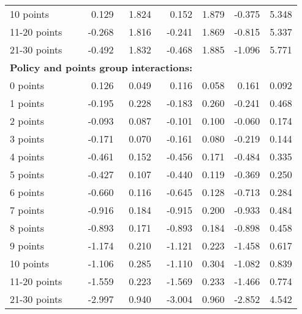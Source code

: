 \begin{table}
\begin{tabular}{l r r r r r r}
10 points  &  0.129  &  1.824  &  0.152  &  1.879  & -0.375  &  5.348   \\ 
 
11-20 points  & -0.268  &  1.816  & -0.241  &  1.869  & -0.815  &  5.337   \\ 
 
21-30 points  & -0.492  &  1.832  & -0.468  &  1.885  & -1.096  &  5.771   \\ 
 

\hline 
 
\multicolumn{4}{l}{\textbf{Policy and points group interactions:}}  \\ 
 
0 points  &  0.126  &  0.049  &  0.116  &  0.058  &  0.161  &  0.092   \\ 
 
1 points  & -0.195  &  0.228  & -0.183  &  0.260  & -0.241  &  0.468   \\ 
 
2 points  & -0.093  &  0.087  & -0.101  &  0.100  & -0.060  &  0.174   \\ 
 
3 points  & -0.171  &  0.070  & -0.161  &  0.080  & -0.219  &  0.144   \\ 
 
4 points  & -0.461  &  0.152  & -0.456  &  0.171  & -0.484  &  0.335   \\ 
 
5 points  & -0.427  &  0.107  & -0.440  &  0.119  & -0.369  &  0.250   \\ 
 
6 points  & -0.660  &  0.116  & -0.645  &  0.128  & -0.713  &  0.284   \\ 
 
7 points  & -0.916  &  0.184  & -0.915  &  0.200  & -0.933  &  0.484   \\ 
 
8 points  & -0.893  &  0.171  & -0.893  &  0.184  & -0.898  &  0.458   \\ 
 
9 points  & -1.174  &  0.210  & -1.121  &  0.223  & -1.458  &  0.617   \\ 
 
10 points  & -1.106  &  0.285  & -1.110  &  0.304  & -1.082  &  0.839   \\ 
 
11-20 points  & -1.559  &  0.223  & -1.569  &  0.233  & -1.466  &  0.774   \\ 
 
21-30 points  & -2.997  &  0.940  & -3.004  &  0.960  & -2.852  &  4.542   \\ 
 

\end{tabular}
\end{table}

